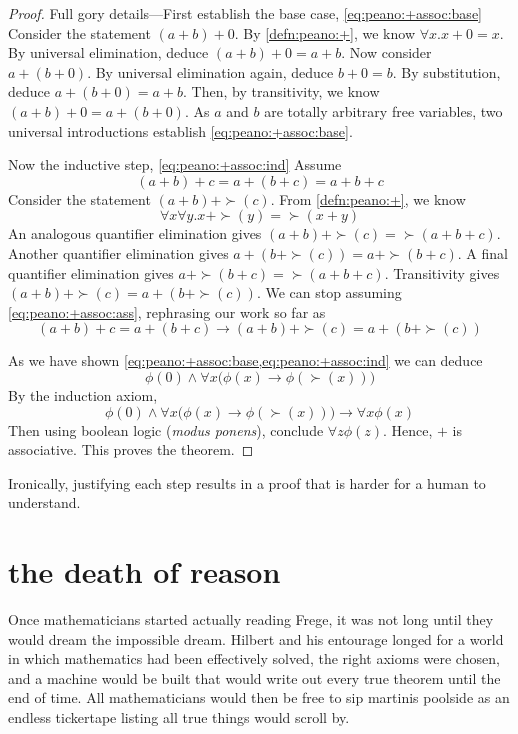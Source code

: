 \documentclass{scrbook}
\renewcommand{\implies}{\to}
\begin{document}
\begin{proof}
  Full gory details---First establish the base case, \cref{eq:peano:+assoc:base}
  Consider the statement $(a+b)+0$. By \cref{defn:peano:+}, we know $\forall x . x+0=x$. By universal elimination, deduce $(a+b)+0=a+b$. Now consider
  $a+(b+0)$. By universal elimination again, deduce $b+0=b$. By substitution, deduce $a+(b+0)=a+b$. Then, by transitivity, we know $(a+b)+0=a+(b+0)$. As $a$ and $b$ are totally arbitrary free variables, two universal introductions establish \cref{eq:peano:+assoc:base}.

  Now the inductive step, \cref{eq:peano:+assoc:ind}
  Assume \begin{equation}(a+b)+c=a+(b+c)=a+b+c\label{eq:peano:+assoc:ass}\end{equation}
  Consider the statement $(a+b)+\succ (c)$. From \cref{defn:peano:+}, we know
  \[\forall x \forall y . x+\succ(y)=\succ(x+y)\]
  An analogous quantifier elimination gives $(a+b)+\succ (c) = \succ(a+b+c)$. 
  Another quantifier elimination gives $a+(b+\succ(c))= a+\succ(b+c)$. A final quantifier elimination gives $a+\succ(b+c)=\succ(a+b+c)$. Transitivity gives $(a+b)+\succ(c)=a+(b+\succ(c))$. We can stop assuming \cref{eq:peano:+assoc:ass}, rephrasing our work so far as
  \[
  (a+b)+c=a+(b+c)\implies (a+b)+\succ(c) = a+(b+\succ (c))
  \]
  
  As we have shown \cref{eq:peano:+assoc:base,eq:peano:+assoc:ind} we can deduce 
  \begin{equation}
    \label{eq:peano:+assoc:both}
    \phi(0)\wedge \forall x \bigl(\phi(x)\implies \phi(\succ(x))\bigr)
  \end{equation}
  By the induction axiom, 
  \[
  \phi(0)\wedge \forall x \bigl(\phi(x)\implies \phi(\succ(x))\bigr) \implies \forall x \phi(x)
  \]
  Then using boolean logic (\emph{modus ponens}), conclude $\forall z \phi(z)$. Hence, $+$ is associative. This proves the theorem. 
\end{proof}

Ironically, justifying each step results in a proof that is harder for a human to understand. 
\chapter[The Death of Reason]{the death of reason}
Once mathematicians started actually reading Frege, it was not long until they would dream the impossible dream. Hilbert and his entourage longed for a world in which mathematics had been effectively solved, the right axioms were chosen, and a machine would be built that would write out every true theorem until the end of time. All mathematicians would then be free to sip martinis poolside as an endless tickertape listing all true things would scroll by. \cite{wiki:hilbert-prog}
\end{document}
